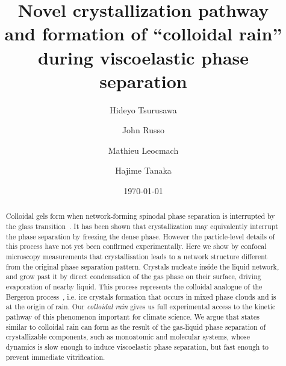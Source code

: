 \documentclass[twocolumn,showpacs,amsmath,amssymb,pre,superscriptaddress]{revtex4}
\begin{document}
\title{Novel crystallization pathway\\and formation of ``colloidal rain'' during viscoelastic phase separation}
\author{Hideyo Tsurusawa}
\author{John Russo}
\author{Mathieu Leocmach}
\author{Hajime Tanaka}


\date{\today}

\begin{abstract}
{
Colloidal gels form when network-forming spinodal phase separation is interrupted by the glass transition~\cite{lu2008gelation}. It has been shown that crystallization may equivalently interrupt the phase separation by freezing the dense phase. However the particle-level details of this process have not yet been confirmed experimentally.
Here we show by confocal microscopy measurements that crystallisation leads to a network structure different from the original phase separation pattern. Crystals nucleate inside the liquid network, and grow past it by direct condensation of the gas phase on their surface, driving evaporation of nearby liquid.
This process represents the colloidal analogue of the Bergeron process~\cite{glickman2000glossary}, i.e. ice crystals formation that occurs in mixed phase clouds and is at the origin of rain. Our \emph{colloidal rain} gives us full experimental access to the kinetic pathway of this phenomenon important for climate science.
We argue that states similar to colloidal rain can form as the result of the gas-liquid phase separation of crystallizable components, such as monoatomic and molecular systems, whose dynamics is slow enough to induce viscoelastic phase separation, but fast enough to prevent immediate vitrification.
}
\end{abstract}
 
\end{document}
